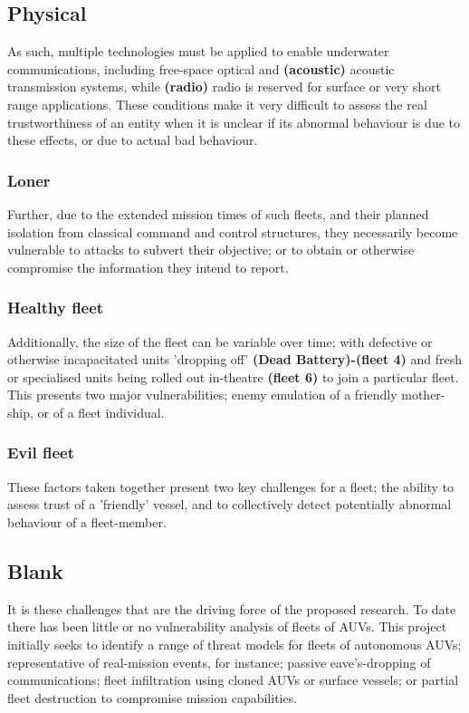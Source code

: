 \documentclass[oneside,11pt,a4paper]{Latex/Classes/PhDthesisPSnPDF}
\begin{document}
\begin{doublespace}
\subsection{Physical}
As such, multiple technologies must be applied to enable underwater
communications, including free-space optical and \textbf{(acoustic)} acoustic
transmission systems, while \textbf{(radio)} radio is reserved for surface or
very short range applications. These conditions make it very difficult to assess the real trustworthiness of an entity when it is unclear if
its abnormal behaviour is due to these effects, or due to actual bad behaviour.

\subsubsection{Loner}  Further, due to the extended mission times of such
fleets, and their planned isolation from classical command and control structures, they
necessarily become vulnerable to attacks to subvert their objective; or to
obtain or otherwise compromise the information they intend to report.

\subsubsection{Healthy fleet}  Additionally, the size of the fleet can be
variable over time; with defective or otherwise incapacitated units 'dropping off' \textbf{(Dead
Battery)-(fleet 4)} and fresh or specialised units being rolled out in-theatre
\textbf{(fleet 6)} to join a particular fleet. This presents two major
vulnerabilities; enemy emulation of a friendly mother-ship, or of a fleet individual.

\subsubsection{Evil fleet}  These factors taken together present two key
challenges for a fleet; the ability to assess trust of a 'friendly' vessel, and to collectively
detect potentially abnormal behaviour of a fleet-member.

\subsection{Blank}
It is these challenges that are the driving force of the proposed research. To
date there has been little or no vulnerability analysis of fleets of AUVs. This
project initially seeks to identify a range of threat models for fleets of
autonomous AUVs; representative of real-mission events, for instance; passive
eave's-dropping of communications; fleet infiltration using cloned AUVs or
surface vessels; or partial fleet destruction to compromise mission
capabilities.


\end{doublespace}
\end{document}
